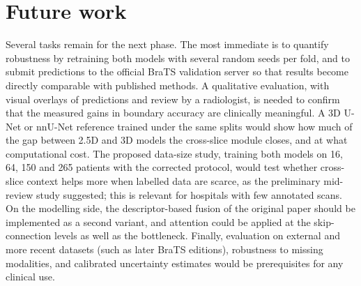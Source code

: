 \section{Future work}
Several tasks remain for the next phase. The most immediate is to quantify robustness by retraining both models with several random seeds per fold, and to submit predictions to the official BraTS validation server so that results become directly comparable with published methods. A qualitative evaluation, with visual overlays of predictions and review by a radiologist, is needed to confirm that the measured gains in boundary accuracy are clinically meaningful. A 3D U-Net or nnU-Net reference trained under the same splits would show how much of the gap between 2.5D and 3D models the cross-slice module closes, and at what computational cost. The proposed data-size study, training both models on 16, 64, 150 and 265 patients with the corrected protocol, would test whether cross-slice context helps more when labelled data are scarce, as the preliminary mid-review study suggested; this is relevant for hospitals with few annotated scans. On the modelling side, the descriptor-based fusion of the original paper should be implemented as a second variant, and attention could be applied at the skip-connection levels as well as the bottleneck. Finally, evaluation on external and more recent datasets (such as later BraTS editions), robustness to missing modalities, and calibrated uncertainty estimates would be prerequisites for any clinical use.
